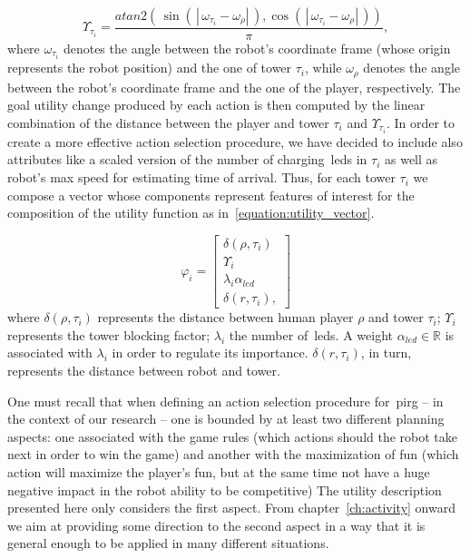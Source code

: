 \begin{equation}\label{equation:utility_function}
\Upsilon_{\tau_{i}} = \frac{atan2(\,
\sin(\,\left|\, \omega_{\tau_{i}}-\omega_{\rho}\right|\,),
\cos(\,\left|\,\omega_{\tau_{i}}-\omega_{\rho}\right|\,))}{\pi},
\end{equation}
 where $\omega_{\tau_{i}}$ denotes the angle between the robot's coordinate frame (whose origin represents the robot position) and the one of tower $\tau_{i}$, while $\omega_{\rho}$ denotes the angle between the robot's coordinate frame and the one of the player, respectively. The goal utility change produced by each action is then computed by the linear combination of the distance between the player and tower $\tau_{i}$ and $\Upsilon_{\tau_{i}}$. In order to create a more effective action selection procedure, we have decided to include also attributes like a scaled version of the number of charging~\glspl{led} in $\tau_{i}$ as well as robot's max speed for estimating time of arrival. Thus, for each tower $\tau_{i}$ we compose a vector whose components represent features of interest for the composition of the utility function as in~\ref{equation:utility_vector}.
 
\begin{equation}\label{equation:utility_vector}
\varphi_{i} = 
\begin{bmatrix}
    \delta(\rho,\tau_{i}) \\
    \Upsilon_{i}\\
    \lambda_{i}\alpha_{led}\\
    \delta(r,\tau_{i}),
\end{bmatrix}
\end{equation}
where $\delta(\rho,\tau_{i})$ represents the distance between human player $\rho$ and tower $\tau_{i}$; $\Upsilon_{i}$ represents the tower blocking factor; $\lambda_{i}$ the number of~\glspl{led}. A weight $\alpha_{led} \in \mathbb{R}$ is associated with $\lambda_{i}$ in order to regulate its importance. $\delta(r,\tau_{i})$, in turn, represents the distance between robot and tower.

One must recall that when defining an action selection procedure for~\gls{pirg} -- in the context of our research -- one is bounded by at least two different planning aspects: one associated with the game rules (which actions should the robot take next in order to win the game) and another with the maximization of fun (which action will maximize the player's fun, but at the same time not have a huge negative impact in the robot ability to be competitive) The utility description presented here only considers the first aspect. From chapter~\ref{ch:activity} onward we aim at providing some direction to the second aspect in a way that it is general enough to be applied in many different situations. 

